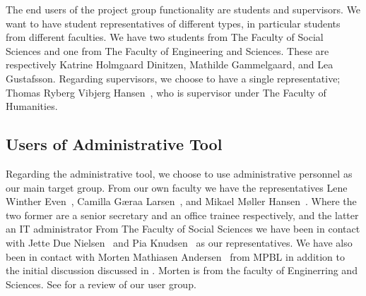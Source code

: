 The end users of the project group functionality are students and supervisors.
We want to have student representatives of different types, in particular students from different faculties.
We have two students from The Faculty of Social Sciences and one from The Faculty of Engineering and Sciences.
These are respectively Katrine Holmgaard Dinitzen, Mathilde Gammelgaard, and Lea Gustafsson.
Regarding supervisors, we choose to have a single representative; Thomas Ryberg Vibjerg Hansen~\cite{thomas}, who is supervisor under The Faculty of Humanities.


\subsection{Users of Administrative Tool}
\label{sub:enduserstool}
Regarding the administrative tool, we choose to use administrative personnel as our main target group.
From our own faculty we have the representatives Lene Winther Even~\cite{lene}, Camilla G\ae{}raa Larsen~\cite{camilla}, and Mikael M\o{}ller Hansen~\cite{mikael}.
Where the two former are a senior secretary and an office trainee respectively, and the latter an IT administrator
From The Faculty of Social Sciences we have been in contact with  Jette Due Nielsen~\cite{jette} and Pia Knudsen~\cite{piak} as our representatives.
We have also been in contact with Morten Mathiasen Andersen~\cite{morten} from MPBL in addition to the initial discussion discussed in .
Morten is from the faculty of Enginerring and Sciences.
See  for a review of our user group.
